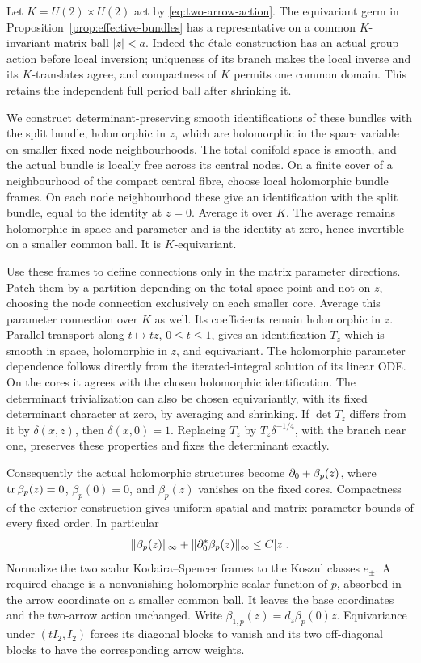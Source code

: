 Let $K=U(2)\times U(2)$ act by
\eqref{eq:two-arrow-action}. The equivariant germ in
Proposition~\ref{prop:effective-bundles} has a representative
on a common $K$-invariant matrix ball $|z|<a$. Indeed the
étale construction has an actual group action before local
inversion; uniqueness of its branch makes the local inverse
and its $K$-translates agree, and compactness of $K$ permits
one common domain. This retains the independent full period
ball after shrinking it.

We construct determinant-preserving smooth identifications
of these bundles with the split bundle, holomorphic in $z$,
which are holomorphic in the space variable on smaller fixed
node neighbourhoods. The total conifold space is smooth,
and the actual bundle is locally free across its central
nodes. On a finite cover of a neighbourhood of the compact
central fibre, choose local holomorphic bundle frames.
On each node neighbourhood these give an identification
with the split bundle, equal to the identity at $z=0$.
Average it over $K$. The average remains holomorphic in
space and parameter and is the identity at zero, hence
invertible on a smaller common ball. It is $K$-equivariant.

Use these frames to define connections only in the matrix
parameter directions. Patch them by a partition depending
on the total-space point and not on $z$, choosing the node
connection exclusively on each smaller core. Average this
parameter connection over $K$ as well. Its coefficients
remain holomorphic in $z$. Parallel transport along
$t\mapsto tz$, $0\le t\le1$, gives an identification $T_z$
which is smooth in space, holomorphic in $z$, and equivariant.
The holomorphic parameter dependence follows directly from
the iterated-integral solution of its linear ODE.
On the cores it agrees with the chosen holomorphic
identification. The determinant trivialization can also
be chosen equivariantly, with its fixed determinant
character at zero, by averaging and shrinking.
If $\det T_z$ differs from it by $\delta(x,z)$, then
$\delta(x,0)=1$. Replacing $T_z$ by $T_z\delta^{-1/4}$,
with the branch near one, preserves these properties and
fixes the determinant exactly.

Consequently the actual holomorphic structures become
$\bar\partial_0+\beta_p(z)$, where $\operatorname{tr}\beta_p(z)=0$,
$\beta_p(0)=0$, and $\beta_p(z)$ vanishes on the fixed
cores. Compactness of the exterior construction gives
uniform spatial and matrix-parameter bounds of every
fixed order. In particular
\begin{equation}\label{eq:initial-beta-bounds}
 \|\beta_p(z)\|_\infty+
             \|\bar\partial_0^*\beta_p(z)\|_\infty\le C|z|.
\end{equation}
Normalize the two scalar Kodaira--Spencer frames to the
Koszul classes $e_\pm$. A required change is a nonvanishing
holomorphic scalar function of $p$, absorbed in the arrow
coordinate on a smaller common ball. It leaves the base
coordinates and the two-arrow action unchanged.
Write $\beta_{1,p}(z)=d_z\beta_p(0)z$.
Equivariance under $(tI_2,I_2)$ forces its diagonal
blocks to vanish and its two off-diagonal blocks to have
the corresponding arrow weights.

